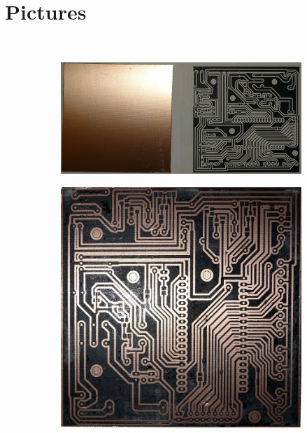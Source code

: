 \section{Pictures}
~
\begin{figure}[H]
	\begin{subfigure}[c]{\linewidth}
		\centering
		\includegraphics[width=\linewidth]{../../pictures/sensorstation/small/DSC00220.JPG}
	\end{subfigure}
	\begin{subfigure}[c]{0.5\linewidth}
		\includegraphics[width=\linewidth]{../../pictures/sensorstation/small/DSC00231.JPG}	
	\end{subfigure}

\end{figure}
